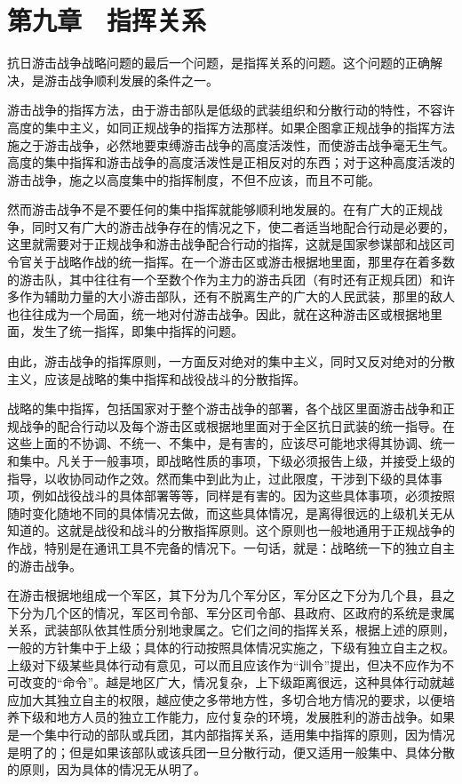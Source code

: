 \section{第九章　指挥关系}

抗日游击战争战略问题的最后一个问题，是指挥关系的问题。这个问题的正确解决，是游击战争顺利发展的条件之一。

游击战争的指挥方法，由于游击部队是低级的武装组织和分散行动的特性，不容许高度的集中主义，如同正规战争的指挥方法那样。如果企图拿正规战争的指挥方法施之于游击战争，必然地要束缚游击战争的高度活泼性，而使游击战争毫无生气。高度的集中指挥和游击战争的高度活泼性是正相反对的东西；对于这种高度活泼的游击战争，施之以高度集中的指挥制度，不但不应该，而且不可能。

然而游击战争不是不要任何的集中指挥就能够顺利地发展的。在有广大的正规战争，同时又有广大的游击战争存在的情况之下，使二者适当地配合行动是必要的，这里就需要对于正规战争和游击战争配合行动的指挥，这就是国家参谋部和战区司令官关于战略作战的统一指挥。在一个游击区或游击根据地里面，那里存在着多数的游击队，其中往往有一个至数个作为主力的游击兵团（有时还有正规兵团）和许多作为辅助力量的大小游击部队，还有不脱离生产的广大的人民武装，那里的敌人也往往成为一个局面，统一地对付游击战争。因此，就在这种游击区或根据地里面，发生了统一指挥，即集中指挥的问题。

由此，游击战争的指挥原则，一方面反对绝对的集中主义，同时又反对绝对的分散主义，应该是战略的集中指挥和战役战斗的分散指挥。

战略的集中指挥，包括国家对于整个游击战争的部署，各个战区里面游击战争和正规战争的配合行动以及每个游击区或根据地里面对于全区抗日武装的统一指导。在这些上面的不协调、不统一、不集中，是有害的，应该尽可能地求得其协调、统一和集中。凡关于一般事项，即战略性质的事项，下级必须报告上级，并接受上级的指导，以收协同动作之效。然而集中到此为止，过此限度，干涉到下级的具体事项，例如战役战斗的具体部署等等，同样是有害的。因为这些具体事项，必须按照随时变化随地不同的具体情况去做，而这些具体情况，是离得很远的上级机关无从知道的。这就是战役和战斗的分散指挥原则。这个原则也一般地通用于正规战争的作战，特别是在通讯工具不完备的情况下。一句话，就是：战略统一下的独立自主的游击战争。

在游击根据地组成一个军区，其下分为几个军分区，军分区之下分为几个县，县之下分为几个区的情况，军区司令部、军分区司令部、县政府、区政府的系统是隶属关系，武装部队依其性质分别地隶属之。它们之间的指挥关系，根据上述的原则，一般的方针集中于上级；具体的行动按照具体情况实施之，下级有独立自主之权。上级对下级某些具体行动有意见，可以而且应该作为“训令”提出，但决不应作为不可改变的“命令”。越是地区广大，情况复杂，上下级距离很远，这种具体行动就越应加大其独立自主的权限，越应使之多带地方性，多切合地方情况的要求，以便培养下级和地方人员的独立工作能力，应付复杂的环境，发展胜利的游击战争。如果是一个集中行动的部队或兵团，其内部指挥关系，适用集中指挥的原则，因为情况是明了的；但是如果该部队或该兵团一旦分散行动，便又适用一般集中、具体分散的原则，因为具体的情况无从明了。

